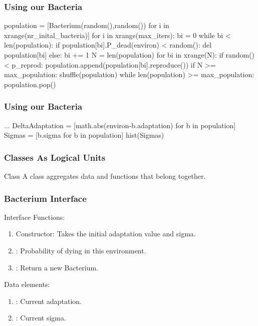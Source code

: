\begin{frame}[fragile] 
\frametitle{Using our Bacteria}
\begin{python}
population = [Bacterium(random(),random())
        for i in xrange(nr_inital_bacteria)]
for i in xrange(max_iters):
    bi = 0
    while bi < len(population):
        if population[bi].P_dead(environ) < random():
            del population[bi]
        else:
            bi += 1
    N = len(population)
    for bi in xrange(N):
        if random() < p_reprod:
            population.append(population[bi].reproduce())
    if N >= max_population:
        shuffle(population)
        while len(population) >= max_population:
            population.pop()
\end{python}
\end{frame}

\begin{frame}[fragile] 
\frametitle{Using our Bacteria}

\begin{python}
...
DeltaAdaptation = [math.abs(environ-b.adaptation) 
                    for b in population]
Sigmas = [b.sigma for b in population]
hist(Sigmas)
\end{python}

\end{frame}

\begin{frame}[fragile] 
\frametitle{Classes As Logical Units}
\begin{block}{Class}
A class aggregates data and functions that belong together.
\end{block}
\end{frame}

\begin{frame}[fragile] 
\frametitle{Bacterium Interface}

\begin{block}{Interface}
Functions:
\begin{enumerate}
\item Constructor: Takes the initial adaptation value and sigma.
\item {}: Probability of dying in this environment.
\item {}: Return a new Bacterium.
\end{enumerate}
Data elements:
\begin{enumerate}
\item {}: Current adaptation.
\item {}: Current sigma.
\end{enumerate}
\end{block}
\end{frame}


